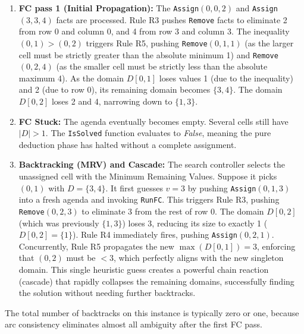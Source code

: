\begin{enumerate}
    \item \textbf{FC pass 1 (Initial Propagation):}
    The \texttt{Assign}$(0,0,2)$ and \texttt{Assign}$(3,3,4)$ facts are processed.
    Rule R3 pushes \texttt{Remove} facts to eliminate 2 from row 0 and column 0, and 4 from row 3 and column 3. 
    The inequality $(0,1) > (0,2)$ triggers Rule R5, pushing \texttt{Remove}$(0,1,1)$ (as the larger cell must be strictly greater than the absolute minimum 1) and \texttt{Remove}$(0,2,4)$ (as the smaller cell must be strictly less than the absolute maximum 4).
    As the domain $D[0,1]$ loses values 1 (due to the inequality) and 2 (due to row 0), its remaining domain becomes $\{3,4\}$. The domain $D[0,2]$ loses 2 and 4, narrowing down to $\{1,3\}$.

    \item \textbf{FC Stuck:} 
    The agenda eventually becomes empty. Several cells still have $|D| > 1$. The \texttt{IsSolved} function evaluates to \textit{False}, meaning the pure deduction phase has halted without a complete assignment.

    \item \textbf{Backtracking (MRV) and Cascade:}
    The search controller selects the unassigned cell with the Minimum Remaining Values. Suppose it picks $(0,1)$ with $D = \{3,4\}$.
    It first guesses $v=3$ by pushing \texttt{Assign}$(0,1,3)$ into a fresh agenda and invoking \texttt{RunFC}.
    This triggers Rule R3, pushing \texttt{Remove}$(0,2,3)$ to eliminate 3 from the rest of row 0.
    The domain $D[0,2]$ (which was previously $\{1,3\}$) loses 3, reducing its size to exactly 1 ($D[0,2] = \{1\}$).
    Rule R4 immediately fires, pushing \texttt{Assign}$(0,2,1)$.
    Concurrently, Rule R5 propagates the new $\max(D[0,1]) = 3$, enforcing that $(0,2)$ must be $< 3$, which perfectly aligns with the new singleton domain.
    This single heuristic guess creates a powerful chain reaction (cascade) that rapidly collapses the remaining domains, successfully finding the solution without needing further backtracks.
\end{enumerate}

The total number of backtracks on this instance is typically zero or one,
because arc consistency eliminates almost all ambiguity after the first FC
pass.